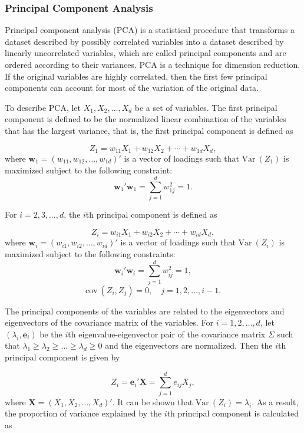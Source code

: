 \documentclass[]{book}
\theoremstyle{definition}
\theoremstyle{definition}
\theoremstyle{definition}
\theoremstyle{remark}
\begin{document}
\subsubsection{Principal Component
Analysis}\label{principal-component-analysis}

Principal component analysis (PCA) is a statistical procedure that
transforms a dataset described by possibly correlated variables into a
dataset described by linearly uncorrelated variables, which are called
principal components and are ordered according to their variances. PCA
is a technique for dimension reduction. If the original variables are
highly correlated, then the first few principal components can account
for most of the variation of the original data.

To describe PCA, let \(X_1,X_2,\ldots,X_d\) be a set of variables. The
first principal component is defined to be the normalized linear
combination of the variables that has the largest variance, that is, the
first principal component is defined as

\[Z_1=w_{11} X_1 + w_{12} X_2 + \cdots + w_{1d} X_d,\] where
\(\textbf{w}_1=(w_{11}, w_{12}, \ldots, w_{1d})'\) is a vector of
loadings such that \(\mathrm{Var~}{(Z_1)}\) is maximized subject to the
following constraint:
\[\textbf{w}_1'\textbf{w}_1 = \sum_{j=1}^d w_{1j}^2 = 1.\]

For \(i=2,3,\ldots,d\), the \(i\)th principal component is defined as

\[Z_i=w_{i1} X_1 + w_{i2} X_2 + \cdots + w_{id} X_d,\] where
\(\textbf{w}_i=(w_{i1}, w_{i2}, \ldots, w_{id})'\) is a vector of
loadings such that \(\mathrm{Var~}{(Z_i)}\) is maximized subject to the
following constraints:
\[\textbf{w}_i'\textbf{w}_i=\sum_{j=1}^d w_{ij}^2 = 1,\]
\[\mathrm{cov~}{(Z_i, Z_j)} = 0,\quad j=1,2,\ldots,i-1.\]

The principal components of the variables are related to the
eigenvectors and eigenvectors of the covariance matrix of the variables.
For \(i=1,2,\ldots,d\), let \((\lambda_i, \textbf{e}_i)\) be the \(i\)th
eigenvalue-eigenvector pair of the covariance matrix \({\Sigma}\) such
that \(\lambda_1\ge \lambda_2\ge \ldots\ge \lambda_d\ge 0\) and the
eigenvectors are normalized. Then the \(i\)th principal component is
given by

\[Z_{i} = \textbf{e}_i' \textbf{X} =\sum_{j=1}^d e_{ij} X_j,\] where
\(\textbf{X}=(X_1,X_2,\ldots,X_d)'\). It can be shown that
\(\mathrm{Var~}{(Z_i)} = \lambda_i\). As a result, the proportion of
variance explained by the \(i\)th principal component is calculated as
\end{document}
